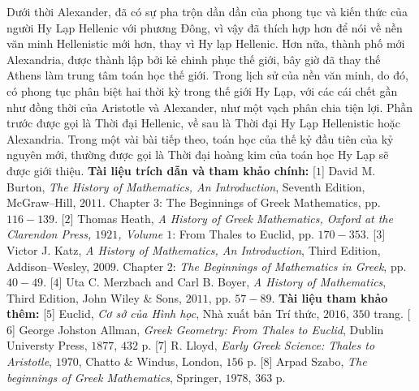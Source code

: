 \begin{multicols}{2}
	Dưới thời Alexander, đã có sự pha trộn dần dần của phong tục và kiến thức của người Hy Lạp Hellenic với phương Đông, vì vậy đã thích hợp hơn  để nói về nền văn minh Hellenistic mới hơn, thay vì Hy lạp Hellenic. 
	\vskip 0.1cm
	Hơn nữa, thành phố mới Alexandria, được thành lập bởi kẻ chinh phục thế giới, bây giờ đã thay thế Athens làm trung tâm toán học thế giới. 
	\vskip 0.1cm
	Trong lịch sử của nền văn minh, do đó, có phong tục phân biệt hai thời kỳ trong thế giới Hy Lạp, với các cái chết gần như đồng thời của Aristotle và Alexander, như một vạch phân chia tiện lợi. Phần trước được gọi là Thời đại Hellenic, về sau là Thời đại Hy Lạp Hellenistic hoặc Alexandria. Trong một vài bài tiếp theo, toán học của thế kỷ đầu tiên của kỷ nguyên mới, thường được gọi là Thời đại hoàng kim của toán học Hy Lạp sẽ được giới thiệu.
	\vskip 0.1cm
	\textbf{\color{lichsutoanhoc}Tài liệu trích dẫn và tham khảo chính:}
	\vskip 0.1cm
	[$1$] David M. Burton, \textit{The History of Mathematics, An Introduction}, Seventh Edition, McGraw--Hill, $2011$. Chapter $3$: The Beginnings of Greek Mathematics, pp. $116-139$.
	\vskip 0.1cm
	[$2$] Thomas Heath, \textit{A History of Greek Mathematics, Oxford at the Clarendon Press, $1921$, Volume $1$}: From Thales to Euclid, pp. $170-353$.
	\vskip 0.1cm   
	[$3$] Victor J. Katz, \textit{A History of Mathematics, An Introduction}, Third Edition, Addison--Wesley, $2009$. Chapter $2$: \textit{The Beginnings of Mathematics in Greek}, pp. $40-49$.
	\vskip 0.1cm
	[$4$] Uta C. Merzbach and Carl B. Boyer, \textit{A
	History of Mathematics}, Third Edition, John Wiley \& Sons, $2011$, pp. $57-89$.
	\vskip 0.1cm
	\textbf{\color{lichsutoanhoc}Tài liệu tham khảo thêm:}
	\vskip 0.1cm
	[$5$]  Euclid, \textit{Cơ sở của Hình học}, Nhà xuất bản Trí thức, $2016$, $350$ trang.
	\vskip 0.1cm
	[$6$] George Johston Allman, \textit{Greek Geometry: From Thales to Euclid}, Dublin Universty Press, $1877$, $432$ p.
	\vskip 0.1cm  
	[$7$] R. Lloyd, \textit{Early Greek Science: Thales to Aristotle}, $1970$, Chatto \& Windus, London, $156$ p. 
	\vskip 0.1cm
	[$8$] Arpad Szabo, \textit{The beginnings of Greek Mathematics}, Springer, $1978$, $363$ p.
\end{multicols}

